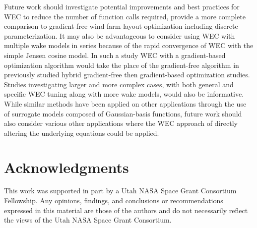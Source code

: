 \documentclass[hidelinks,sort&compress,AMA,STIX1COL]{WileyNJD-v2}
\begin{document}
Future work should investigate potential improvements and best practices for WEC to reduce the number of function calls required, provide a more complete comparison to gradient-free wind farm layout optimization including discrete parameterization. It may also be advantageous to consider using WEC with multiple wake models in series because of the rapid convergence of WEC with the simple Jensen cosine model. In such a study WEC with a gradient-based optimization algorithm would take the place of the gradient-free algorithm in previously studied hybrid gradient-free then gradient-based optimization studies. Studies investigating larger and more complex cases, with both general and specific WEC tuning along with more wake models, would also be informative. While similar methods have been applied on other applications through the use of surrogate models composed of Gaussian-basis functions, future work should also consider various other applications where the WEC approach of directly altering the underlying equations could be applied.

\section*{Acknowledgments}
This work was supported in part by a Utah NASA Space Grant Consortium Fellowship. Any opinions, findings, and conclusions or recommendations expressed in this material are those of the authors and do not necessarily reflect the views of the Utah NASA Space Grant Consortium.

\pagebreak
%

\end{document}
